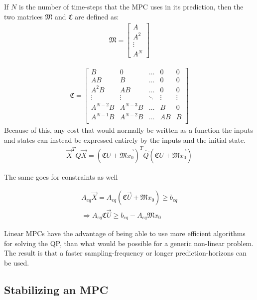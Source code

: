 \noindent
If $N$ is the number of time-steps that the MPC uses in its prediction, then the two matrices $\mathfrak{M}$ and $\mathfrak{C}$ are defined as:
\begin{align}
  \mathfrak{M} = \begin{bmatrix}
    A      \\
    A^2    \\
    \vdots \\
    A^{N}
  \end{bmatrix}
\end{align}

\begin{align}
  \mathfrak{C} =
  \begin{bmatrix}
    B        & 0        & \dots  & 0      & 0      \\
    AB       & B        & \dots  & 0      & 0      \\
    A^2B     & AB       & \dots  & 0      & 0      \\
    \vdots   & \vdots   & \ddots & \vdots & \vdots \\
    A^{N-2}B & A^{N-3}B & \dots  & B      & 0      \\
    A^{N-1}B & A^{N-2}B & \dots  & AB     & B      \\
  \end{bmatrix}
\end{align}
Because of this, any cost that would normally be written as a function the inputs and states can instead be expressed entirely by the inputs and the initial state. 
\begin{align}
  \vec{X}^T \hat{Q} \vec{X}
  = \left( \mathfrak{C}  \vec{U + \mathfrak{M}x_0}\right)^T \hat{Q} \left( \mathfrak{C}  \vec{U + \mathfrak{M}x_0}\right)
\end{align}

The same goes for constraints as well

\begin{align}
  A_{eq}\vec{X} = A_{eq}\left( \mathfrak{C}  \vec{U} + \mathfrak{M}x_0\right) \geq b_{eq} \\
  \Rightarrow A_{eq}\mathfrak{C}  \vec{U}  \geq b_{eq} - A_{eq}\mathfrak{M}x_0
\end{align}

Linear MPCs have the advantage of being able to use more efficient algorithms for solving the QP, than what would be possible for a generic non-linear problem. The result is that a faster sampling-frequency or longer prediction-horizons can be used. 

\subsection{Stabilizing an MPC}

